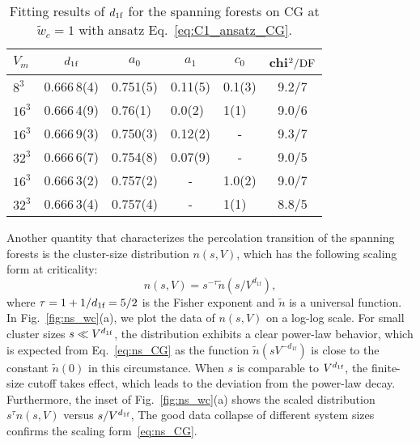 \begin{table}[tb]
\centering
\vspace{3ex}
\caption{Fitting results of ${d_{1\textrm{f}}}$ for the spanning forests on CG at $\tilde{w}_c = 1$ with ansatz Eq.~\eqref{eq:C1_ansatz_CG}.}
\label{tab:C1_wc_CG} 
\begin{tabular}{|lllllc|}
\hline 
$V_{m}$   &\multicolumn{1}{c}{${d_{1\textrm{f}}}$}   &\multicolumn{1}{c}{$a_0$}    
&\multicolumn{1}{c}{$a_1$} &\multicolumn{1}{c}{$c_0$}
& chi$^2/{\rm DF}$     \\
\hline 
$8^3$     &0.666\,8(4)    &0.751(5)   &0.11(5)    &0.1(3)     &9.2/7\\ 
$16^{3}$    &0.666\,4(9)    &0.76(1)    &0.0(2)     &1(1)       &9.0/6\\ 

$16^{3}$    &0.666\,9(3) 	&0.750(3)  	&0.12(2)   	&\multicolumn{1}{c}{-}	&9.3/7\\ 
$32^{3}$    &0.666\,6(7) 	&0.754(8)  	&0.07(9)   	&\multicolumn{1}{c}{-}	&9.0/5\\ 

$16^{3}$    &0.666\,3(2) 	&0.757(2)  	&\multicolumn{1}{c}{-}     	&1.0(2)    	&9.0/7\\ 
$32^{3}$    &0.666\,3(4) 	&0.757(4)  	&\multicolumn{1}{c}{-}     	&1(1)      	&8.8/5\\ 
\hline 
\end{tabular} 
\vspace{3ex}
\end{table} 

Another quantity that characterizes the percolation transition of the spanning forests is the cluster-size distribution $n(s, V)$, which has the following
scaling form at criticality:
\begin{equation}\label{eq:ns_CG}
	n(s, V) = s^{-\tau} \tilde{n}(s/V^{d_{1\textrm{f}}}),
\end{equation}
where $\tau = 1+ 1/{d_{1\textrm{f}}} = 5/2$ is the Fisher exponent and $\tilde{n}$ is a universal function. 
In Fig.~\ref{fig:ns_wc}(a), we plot the data of $n(s, V)$ on a log-log scale. For small cluster sizes $s \ll V^{{d_{1\textrm{f}}}}$, the distribution exhibits a clear power-law behavior, which
is expected from Eq.~\eqref{eq:ns_CG} as the function $\tilde{n}(s V^{-d_{1\textrm{f}}})$ is close to the constant $\tilde{n}(0)$ in this
circumstance. When $s$ is comparable to $V^{{d_{1\textrm{f}}}}$, the finite-size cutoff takes effect, which leads to the deviation from the power-law decay.
Furthermore, the inset of Fig.~\ref{fig:ns_wc}(a) shows the scaled distribution $s^{\tau}n(s, V)$ versus $s/V^{{d_{1\textrm{f}}}}$, 
The good data collapse of different system sizes confirms the scaling form~\eqref{eq:ns_CG}.


